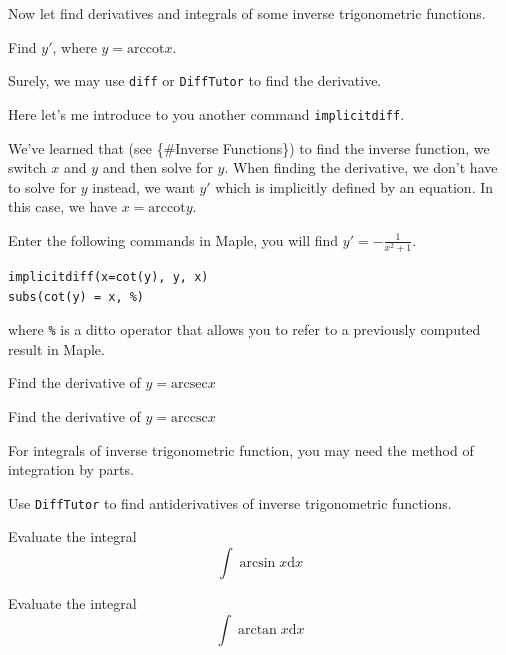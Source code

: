 \documentclass[en,11pt,simple]{elegantbook}
\let\BeginKnitrBlock\begin \let\EndKnitrBlock\end
\begin{document}
Now let find derivatives and integrals of some inverse trigonometric functions.

\BeginKnitrBlock{example}{}{}
\protect\hypertarget{exm:unnamed-chunk-188}{}{\label{exm:unnamed-chunk-188} }
Find \(y'\), where \(y=\mathrm{arccot} x\).
\EndKnitrBlock{example}

\BeginKnitrBlock{solution}{}{}
{}

Surely, we may use \texttt{diff} or \texttt{DiffTutor} to find the derivative.

Here let's me introduce to you another command \texttt{implicitdiff}.

We've learned that (see \{\#Inverse Functions\}) to find the inverse function, we switch \(x\) and \(y\) and then solve for \(y\). When finding the derivative, we don't have to solve for \(y\) instead, we want \(y'\) which is implicitly defined by an equation. In this case, we have \(x=\mathrm{arccot}y\).

Enter the following commands in Maple, you will find \(y'=-\frac{1}{x^2+1}\).

\begin{verbatim}
implicitdiff(x=cot(y), y, x)
subs(cot(y) = x, %)
\end{verbatim}

where \texttt{\%} is a ditto operator that allows you to refer to a previously computed result in Maple.
\EndKnitrBlock{solution}

\BeginKnitrBlock{exercise}{}{}
\protect\hypertarget{exr:unnamed-chunk-190}{}{\label{exr:unnamed-chunk-190} }
Find the derivative of \(y=\mathrm{arcsec} x\)
\EndKnitrBlock{exercise}

\BeginKnitrBlock{exercise}{}{}
\protect\hypertarget{exr:unnamed-chunk-191}{}{\label{exr:unnamed-chunk-191} }
Find the derivative of \(y=\mathrm{arccsc} x\)
\EndKnitrBlock{exercise}

For integrals of inverse trigonometric function, you may need the method of integration by parts.

Use \texttt{DiffTutor} to find antiderivatives of inverse trigonometric functions.

\BeginKnitrBlock{exercise}{}{}
\protect\hypertarget{exr:unnamed-chunk-192}{}{\label{exr:unnamed-chunk-192} }
Evaluate the integral
\[
\int \arcsin x \mathrm{d} x
\]
\EndKnitrBlock{exercise}

\BeginKnitrBlock{exercise}{}{}
\protect\hypertarget{exr:unnamed-chunk-193}{}{\label{exr:unnamed-chunk-193} }
Evaluate the integral
\[
\int \arctan x \mathrm{d} x
\]
\EndKnitrBlock{exercise}
\end{document}
